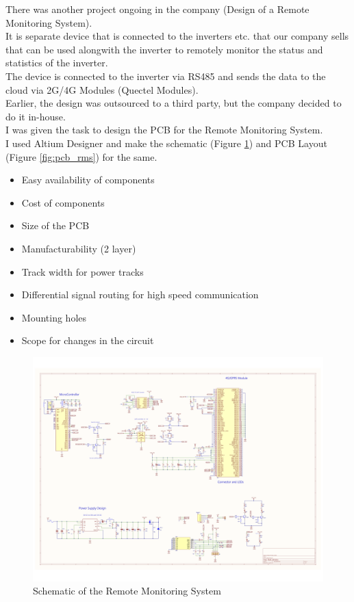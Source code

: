 There was another project ongoing in the company (Design of a Remote Monitoring System).\\
\noindent
It is separate device that is connected to the inverters etc. that our company sells that can be used alongwith the inverter to remotely monitor the status and statistics of the inverter.\\
\noindent
The device is connected to the inverter via RS485 and sends the data to the cloud via 2G/4G Modules (Quectel Modules).\\
\noindent
Earlier, the design was outsourced to a third party, but the company decided to do it in-house.\\
\noindent
I was given the task to design the PCB for the Remote Monitoring System.\\
\noindent
I used Altium Designer and make the schematic (Figure \ref*{fig:schematic_rms}) and PCB Layout (Figure \ref*{fig:pcb_rms}) for the same.
\begin{itemize}
    \item Easy availability of components
    \item Cost of components
    \item Size of the PCB
    \item Manufacturability (2 layer)
    \item Track width for power tracks
    \item Differential signal routing for high speed communication
    \item Mounting holes
    \item Scope for changes in the circuit
\end{itemize}
\begin{figure}[H]
    \centering
    \includegraphics[width=\textwidth]{images/schematic.png}
    \caption{Schematic of the Remote Monitoring System}
    \label{fig:schematic_rms}
\end{figure}
